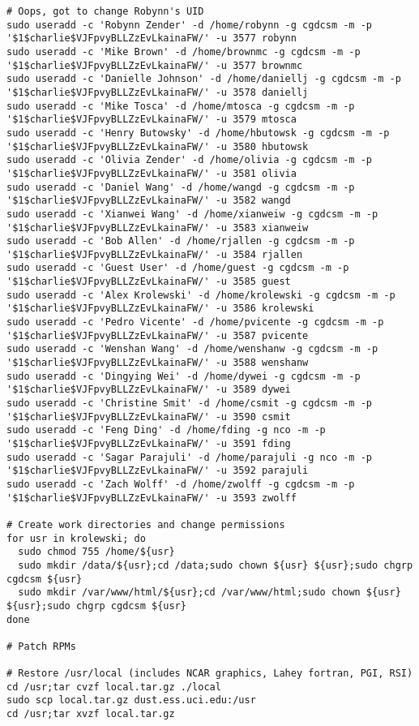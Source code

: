 \documentclass[12pt,twoside]{article}
\begin{document}
\begin{verbatim}
# Oops, got to change Robynn's UID
sudo useradd -c 'Robynn Zender' -d /home/robynn -g cgdcsm -m -p '$1$charlie$VJFpvyBLLZzEvLkainaFW/' -u 3577 robynn
sudo useradd -c 'Mike Brown' -d /home/brownmc -g cgdcsm -m -p '$1$charlie$VJFpvyBLLZzEvLkainaFW/' -u 3577 brownmc
sudo useradd -c 'Danielle Johnson' -d /home/daniellj -g cgdcsm -m -p '$1$charlie$VJFpvyBLLZzEvLkainaFW/' -u 3578 daniellj
sudo useradd -c 'Mike Tosca' -d /home/mtosca -g cgdcsm -m -p '$1$charlie$VJFpvyBLLZzEvLkainaFW/' -u 3579 mtosca
sudo useradd -c 'Henry Butowsky' -d /home/hbutowsk -g cgdcsm -m -p '$1$charlie$VJFpvyBLLZzEvLkainaFW/' -u 3580 hbutowsk
sudo useradd -c 'Olivia Zender' -d /home/olivia -g cgdcsm -m -p '$1$charlie$VJFpvyBLLZzEvLkainaFW/' -u 3581 olivia
sudo useradd -c 'Daniel Wang' -d /home/wangd -g cgdcsm -m -p '$1$charlie$VJFpvyBLLZzEvLkainaFW/' -u 3582 wangd
sudo useradd -c 'Xianwei Wang' -d /home/xianweiw -g cgdcsm -m -p '$1$charlie$VJFpvyBLLZzEvLkainaFW/' -u 3583 xianweiw
sudo useradd -c 'Bob Allen' -d /home/rjallen -g cgdcsm -m -p '$1$charlie$VJFpvyBLLZzEvLkainaFW/' -u 3584 rjallen
sudo useradd -c 'Guest User' -d /home/guest -g cgdcsm -m -p '$1$charlie$VJFpvyBLLZzEvLkainaFW/' -u 3585 guest
sudo useradd -c 'Alex Krolewski' -d /home/krolewski -g cgdcsm -m -p '$1$charlie$VJFpvyBLLZzEvLkainaFW/' -u 3586 krolewski
sudo useradd -c 'Pedro Vicente' -d /home/pvicente -g cgdcsm -m -p '$1$charlie$VJFpvyBLLZzEvLkainaFW/' -u 3587 pvicente
sudo useradd -c 'Wenshan Wang' -d /home/wenshanw -g cgdcsm -m -p '$1$charlie$VJFpvyBLLZzEvLkainaFW/' -u 3588 wenshanw
sudo useradd -c 'Dingying Wei' -d /home/dywei -g cgdcsm -m -p '$1$charlie$VJFpvyBLLZzEvLkainaFW/' -u 3589 dywei
sudo useradd -c 'Christine Smit' -d /home/csmit -g cgdcsm -m -p '$1$charlie$VJFpvyBLLZzEvLkainaFW/' -u 3590 csmit
sudo useradd -c 'Feng Ding' -d /home/fding -g nco -m -p '$1$charlie$VJFpvyBLLZzEvLkainaFW/' -u 3591 fding
sudo useradd -c 'Sagar Parajuli' -d /home/parajuli -g nco -m -p '$1$charlie$VJFpvyBLLZzEvLkainaFW/' -u 3592 parajuli
sudo useradd -c 'Zach Wolff' -d /home/zwolff -g cgdcsm -m -p '$1$charlie$VJFpvyBLLZzEvLkainaFW/' -u 3593 zwolff

# Create work directories and change permissions 
for usr in krolewski; do
  sudo chmod 755 /home/${usr}
  sudo mkdir /data/${usr};cd /data;sudo chown ${usr} ${usr};sudo chgrp cgdcsm ${usr}
  sudo mkdir /var/www/html/${usr};cd /var/www/html;sudo chown ${usr} ${usr};sudo chgrp cgdcsm ${usr}
done

# Patch RPMs

# Restore /usr/local (includes NCAR graphics, Lahey fortran, PGI, RSI)
cd /usr;tar cvzf local.tar.gz ./local
sudo scp local.tar.gz dust.ess.uci.edu:/usr
cd /usr;tar xvzf local.tar.gz


\end{verbatim}
\end{document}
